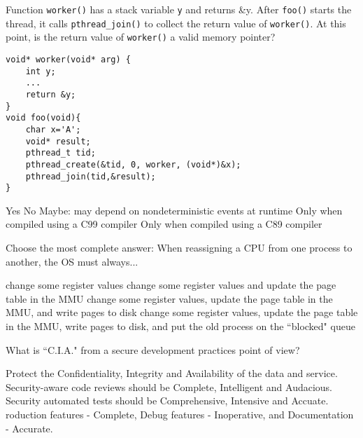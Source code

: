 \variant
Function {\tt worker()} has a stack variable {\tt y} and returns \&y. After {\tt foo()} starts the thread, it calls {\tt pthread_join()} to collect the return value of {\tt worker()}.  At this point, is the return value of {\tt worker()} a valid memory pointer?
\begin{verbatim}
void* worker(void* arg) {
    int y;
    ...
    return &y;
}
void foo(void){
    char x='A';
    void* result;
    pthread_t tid;
    pthread_create(&tid, 0, worker, (void*)&x);
    pthread_join(tid,&result);
}
\end{verbatim}
\begin{answers}
\answer Yes
\correctanswer No 
\answer Maybe: may depend on nondeterministic events at runtime
\answer Only when compiled using a C99 compiler
\answer Only when compiled using a C89 compiler
\end{answers}
\begin{solution}
\end{solution}

\variant
Choose the most complete answer:  When reassigning a CPU from one process to another, the OS must always...
\begin{answers}
\answer change some register values
\correctanswer change some register values and update the page table in the MMU
\answer change some register values, update the page table in the MMU, and write pages to disk
\answer change some register values, update the page table in the MMU, write pages to disk, and put the old process on the ``blocked" queue
\end{answers}
\begin{solution}
\end{solution}




\variant
What is ``C.I.A." from a secure development practices point of view?

\begin{answers}
\correctanswer Protect the Confidentiality, Integrity and Availability of the data and service.
\answer Security-aware code reviews should be Complete, Intelligent and Audacious.
\answer Security automated tests should be Comprehensive, Intensive and Accuate.
\answer roduction features - Complete, Debug features - Inoperative, and Documentation - Accurate.
\end{answers}
\begin{solution}
\end{solution}



